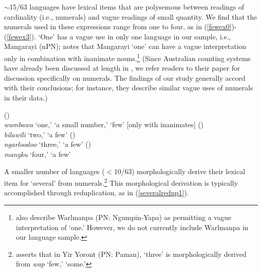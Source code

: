 \documentclass[12pt,egregdoesnotlikesansseriftitles]{scrartcl}
\begin{document}
$\sim$15/63 languages have lexical items that are polysemous between readings of cardinality (i.e., numerals) and vague readings of small quantity.  We find that the numerals used in these expressions range from one to four, as in (\ref{fewex0})-(\ref{fewex3}). `One' has a vague use in only one language in our sample, i.e., Mangarayi (nPN); \citet[93]{merlan89} notes that Mangarayi `one' can have a vague interpretation only in combination with inanimate nouns.\footnote{\citet[143]{bowernzentz12} also describe Warlmanpa (PN: Ngumpin-Yapa) as permitting a vague interpretation of `one.' However, we do not currently include Warlmanpa in our language sample.} (Since Australian counting systems have already been discussed at length in \cite{bowernzentz12}, we refer readers to their paper for discussion specifically on numerals. The findings of our study generally accord with their conclusions; for instance, they describe similar vague uses of numerals in their data.)


\begin{exe}
\hfill (\citealt[93]{merlan89})\\
\textit{wumbawa} `one,' `a small number,' `few' [only with inanimates] \label{fewex0}
   \hfill(\citealt[9]{waters83})\\
  {\it bilawili} `two,' `a few' \label{fewex1}
   \hfill (\citealt[149]{mcgregor90}) \label{fewex2}\\
  \textit{ngarloodoo} `three,' `a few'
  \hfill (\citealt[27,82]{thompson88})\\
  {\it mangku} `four,' `a few' \label{fewex3}
\end{exe}

A smaller number of languages ($<$10/63) morphologically derive their lexical item for `several' from numerals.\footnote{\citet[51]{alpher73} asserts that in Yir Yoront (PN: Paman), \textit{} `three' is morphologically derived from \textit{wap} `few,' `some.'} This morphological derivation is typically accomplished through reduplication, as in (\ref{severalredup1}).
\end{document}
